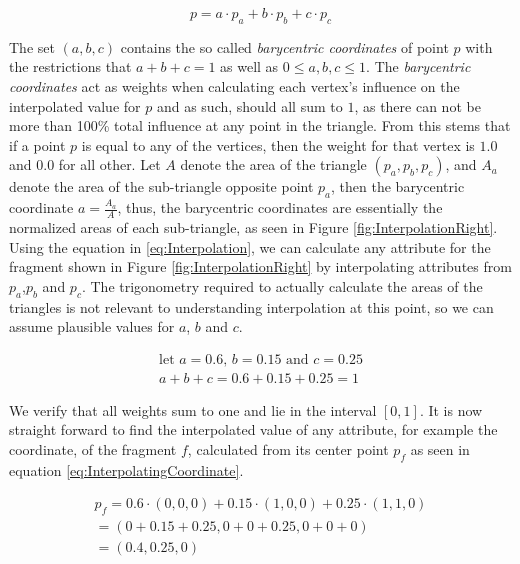 \begin{equation}\label{eq:Interpolation}
    p = a \cdot p_a + b \cdot p_b + c \cdot p_c
\end{equation}

The set $(a,b,c)$ contains the so called \textit{barycentric coordinates} of point $p$ with the restrictions that $a+b+c = 1$ as well as $0 \leq a,b,c \leq 1$. The \textit{barycentric coordinates} act as weights when calculating each vertex's influence on the interpolated value for $p$ and as such, should all sum to $1$, as there can not be more than 100\% total influence at any point in the triangle. From this stems that if a point $p$ is equal to any of the vertices, then the weight for that vertex is $1.0$ and $0.0$ for all other.  Let $A$ denote the area of the triangle $(p_a,p_b,p_c)$, and $A_a$ denote the area of the sub-triangle opposite point $p_a$, then the barycentric coordinate $a = \frac{A_a}{A}$, thus, the barycentric coordinates are essentially the normalized areas of each sub-triangle, as seen in Figure \ref{fig:InterpolationRight}. Using the equation in \ref{eq:Interpolation}, we can calculate any attribute for the fragment shown in Figure \ref{fig:InterpolationRight} by interpolating attributes from $p_a$,$p_b$ and $p_c$. The trigonometry required to actually calculate the areas of the triangles is not relevant to understanding interpolation at this point, so we can assume plausible values for $a$, $b$ and $c$.

\begin{equation*}
    \begin{aligned}
    \text{let } a = 0.6 \text{, } b = 0.15 \text{ and } c = 0.25\\
    a + b + c = 0.6 + 0.15 + 0.25 = 1
    \end{aligned}
\end{equation*}

We verify that all weights sum to one and lie in the interval $[0,1]$. It is now straight forward to find the interpolated value of any attribute, for example the coordinate, of the fragment $f$, calculated from its center point $p_f$ as seen in equation \ref{eq:InterpolatingCoordinate}.

\begin{equation}\label{eq:InterpolatingCoordinate}
    \begin{aligned}
        p_f = 0.6 \cdot (0,0,0) + 0.15 \cdot (1,0,0) + 0.25\cdot (1,1,0) \\
        = (0+0.15+0.25, 0+0+0.25, 0+0+0) \\
        = (0.4, 0.25, 0)
    \end{aligned}
\end{equation}

